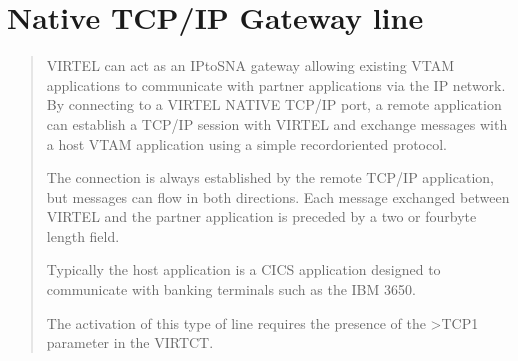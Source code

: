 \documentclass[letterpaper,10pt,english]{sphinxmanual}
\begin{document}
\section{Native TCP/IP Gateway line}
\label{\detokenize{connectivity_guide:native-tcp-ip-gateway-line}}\label{\detokenize{connectivity_guide:index-34}}\begin{quote}

\sphinxAtStartPar
VIRTEL can act as an IP\sphinxhyphen{}to\sphinxhyphen{}SNA gateway allowing existing VTAM applications to communicate with partner applications via the IP network. By connecting to a VIRTEL NATIVE TCP/IP port, a remote application can establish a TCP/IP session with VIRTEL and exchange messages with a host VTAM application using a simple record\sphinxhyphen{}oriented protocol.

\sphinxAtStartPar
The connection is always established by the remote TCP/IP application, but messages can flow in both directions. Each message  exchanged between VIRTEL and the partner application is preceded by a two\sphinxhyphen{} or four\sphinxhyphen{}byte length field.

\sphinxAtStartPar
Typically the host application is a CICS application designed to communicate with banking terminals such as the IBM 3650.

\sphinxAtStartPar
The activation of this type of line requires the presence of the \textgreater{}TCP1 parameter in the VIRTCT.
\end{quote}

\sphinxAtStartPar
{}

\ignorespaces 
\end{document}
